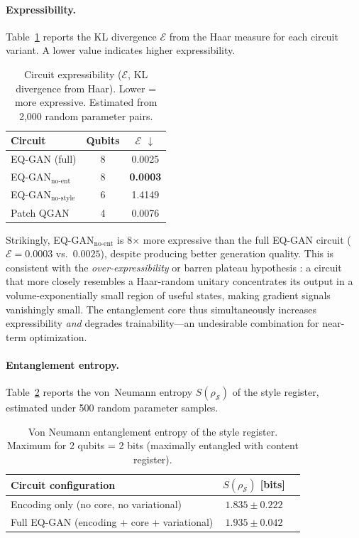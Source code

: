 \documentclass[twocolumn]{article}
\begin{document}
\paragraph{Expressibility.}
Table~\ref{tab:expressibility} reports the KL divergence $\mathcal{E}$ from
the Haar measure for each circuit variant. A lower value indicates higher
expressibility.

\begin{table}[h]
  \centering
  \caption{Circuit expressibility ($\mathcal{E}$, KL divergence from Haar).
    Lower = more expressive. Estimated from 2{,}000 random parameter pairs.}
  \label{tab:expressibility}
  \small
  \begin{tabular}{lcc}
    \toprule
    Circuit & Qubits & $\mathcal{E}$ $\downarrow$ \\
    \midrule
    EQ-GAN (full)            & 8 & 0.0025 \\
    EQ-GAN$_\text{no-ent}$   & 8 & \textbf{0.0003} \\
    EQ-GAN$_\text{no-style}$ & 6 & 1.4149 \\
    Patch QGAN               & 4 & 0.0076 \\
    \bottomrule
  \end{tabular}
\end{table}

Strikingly, EQ-GAN$_\text{no-ent}$ is 8$\times$ more expressive than the full
EQ-GAN circuit ($\mathcal{E} = 0.0003$ vs.\ $0.0025$), despite producing better
generation quality. This is consistent with the \emph{over-expressibility} or
barren plateau hypothesis \cite{mcclean2018barren}: a circuit that more closely
resembles a Haar-random unitary concentrates its output in a volume-exponentially
small region of useful states, making gradient signals vanishingly small.
The entanglement core thus simultaneously increases expressibility \emph{and}
degrades trainability—an undesirable combination for near-term optimization.

\paragraph{Entanglement entropy.}
Table~\ref{tab:entropy} reports the von~Neumann entropy $S(\rho_\mathcal{S})$
of the style register, estimated under 500 random parameter samples.

\begin{table}[h]
  \centering
  \caption{Von Neumann entanglement entropy of the style register.
    Maximum for 2 qubits = 2 bits (maximally entangled with content register).}
  \label{tab:entropy}
  \small
  \begin{tabular}{lcc}
    \toprule
    Circuit configuration & $S(\rho_\mathcal{S})$ [bits] \\
    \midrule
    Encoding only (no core, no variational) & $1.835 \pm 0.222$ \\
    Full EQ-GAN (encoding + core + variational) & $1.935 \pm 0.042$ \\
    \bottomrule
  \end{tabular}
\end{table}
\end{document}
